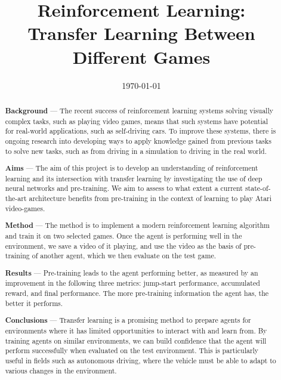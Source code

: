 \documentclass[12pt,a4paper]{article}
\title{Reinforcement Learning: \\Transfer Learning Between Different Games}
\author{} %
\date{\today}
\begin{document}
\maketitle

\begin{abstract}

\begin{flushleft} 
{\bf Background} --- The recent success of reinforcement learning systems solving visually complex tasks, such as playing video games, means that such systems have potential for real-world applications, such as self-driving cars. To improve these systems, there is ongoing research into developing ways to apply knowledge gained from previous tasks to solve new tasks, such as from driving in a simulation to driving in the real world.
\end{flushleft}

\begin{flushleft}
{\bf Aims} --- The aim of this project is to develop an understanding of reinforcement learning and its intersection with transfer learning by investigating the use of deep neural networks and pre-training. We aim to assess to what extent a current state-of-the-art architecture benefits from pre-training in the context of learning to play Atari video-games.
\end{flushleft}

\begin{flushleft}
{\bf Method} --- The method is to implement a modern reinforcement learning algorithm and train it on two selected games. Once the agent is performing well in the environment, we save a video of it playing, and use the video as the basis of pre-training of another agent, which we then evaluate on the test game.    
\end{flushleft}

\begin{flushleft}
{\bf Results} --- Pre-training leads to the agent performing better, as measured by an improvement in the following three metrics: jump-start performance, accumulated reward, and final performance. The more pre-training information the agent has, the better it performs. 
\end{flushleft}

\begin{flushleft}
{\bf Conclusions} --- Transfer learning is a promising method to prepare agents for environments where it has limited opportunities to interact with and learn from. By training agents on similar environments, we can build confidence that the agent will perform successfully when evaluated on the test environment. This is particularly useful in fields such as autonomous driving, where the vehicle must be able to adapt to various changes in the environment.
\end{flushleft}

\end{abstract}
\end{document}
